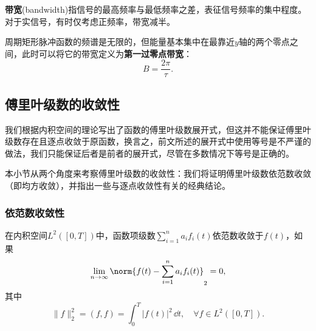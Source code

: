 \begin{definition}[带宽]
    \textbf{带宽}(bandwidth)指信号的最高频率与最低频率之差，表征信号频率的集中程度。对于实信号，有时仅考虑正频率\cite{signal_systems}，带宽减半。

    周期矩形脉冲函数的频谱是无限的，但能量基本集中在最靠近$y$轴的两个零点之间，此时可以将它的带宽定义为\textbf{第一过零点带宽}：
    \begin{equation}
        B=\frac{2\pi}{\tau}.
    \end{equation}
\end{definition}

\subsection{傅里叶级数的收敛性}\label{sub:fourier_series_convergency}

我们根据内积空间的理论写出了函数的傅里叶级数展开式，但这并不能保证傅里叶级数存在且逐点收敛于原函数，换言之，前文所述的展开式中使用等号是不严谨的做法，我们只能保证后者是前者的展开式，尽管在多数情况下等号是正确的。

本小节从两个角度来考察傅里叶级数的收敛性：我们将证明傅里叶级数依范数收敛（即均方收敛），并指出一些与逐点收敛性有关的经典结论。

\subsubsection{依范数收敛性}

\begin{definition}[依范数收敛]
    在内积空间$L^2([0,T])$中，函数项级数$\sum_{i = 1}^{n} a_i f_i(t)$依范数收敛于$f(t)$，如果
    \begin{equation}
        \lim_{n \to \infty} \norm{f(t)-\sum_{i = 1}^{n} a_i f_i(t)}_2=0,
    \end{equation}
    其中
    \begin{equation}
        \|f\|_2^2=(f,f)=\int_{0}^{T}|f(t)|^2\,\dd t,\quad \forall f\in L^2([0,T]).
    \end{equation}
\end{definition}

